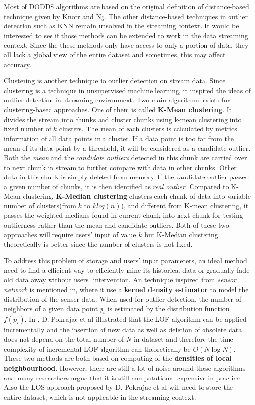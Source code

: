\documentclass[11pt]{article}       %
\begin{document}
Most of DODDS algorithms are based on the original definition of distance-based technique given by Knorr and Ng\cite{EKnorr:1998}. The other distance-based techniques in outlier detection such as KNN remain unsolved in the streaming context. It would be interested to see if those methods can be extended to work in the data streaming context. Since the these methods only have access to only a portion of data, they all lack a global view of the entire dataset and sometimes, this may affect accuracy. 

Clustering is another technique to outlier detection on stream data. Since clustering is a technique in unsupervised machine learning, it inspired the ideas of outlier detection in streaming environment. Two main algorithms exists for clustering-based approaches. One of them is called \textbf{K-Mean clustering}\cite{04666541}. It divides the stream into chunks and cluster chunks using k-mean clustering into fixed number of $k$ clusters. The mean of each clusters is calculated by metrics information of all data points in a cluster. If a data point is too far from the mean of its data point by a threshold, it will be considered as a candidate outlier. Both the \textit{mean} and the \textit{candidate outliers} detected in this chunk are carried over to next chunk in stream to further compare with data in other chunks. Other data in this chunk is simply deleted from memory. If the candidate outlier passed a given number of chunks, it is then identified as \textit{real outlier}. Compared to K-Mean clustering, \textbf{K-Median clustering}\cite{DBLP:journals/corr/abs-1002-4003} clusters each chunk of data into variable number of clusters(from $k$ to $k log(n)$), and different from K-mean clustering, it passes the weighted medians found in current chunk into next chunk for testing outlierness rather than the mean and candidate outliers. Both of these two approaches will require users' input of value $k$ but K-Median clustering theoretically is better since the number of clusters is not fixed. 

To address this problem of storage and users' input parameters, an ideal method need to find a efficient way to efficiently mine its historical data or gradually fade old data away without users' intervention. An technique inspired from \textit{sensor network} is mentioned in\cite{Subramaniam:2006:OOD:1182635.1164145}, where it use a \textbf{kernel density estimator} to model the distribution of the sensor data. When used for outlier detection, the number of neighbors of a given data point $p_{i}$ is estimated by the distribution function $f(p_{i})$. In \cite{4221341}, D. Pokrajac et al illustrated that the LOF algorithm can be applied incrementally and the insertion of new data as well as deletion of obsolete data does not depend on the total number of $N$ in dataset and therefore the time complexity of incremental LOF algorithm can theoretically be $O(N\log{N})$. These two methods are both based on computing of the \textbf{densities of local neighbourhood}. However, there are still a lot of noise around these algorithms and many researchers argue that it is still computational expensive in practice. Also the LOS approach proposed by D. Pokrajac et al will need to store the entire dataset, which is not applicable in the streaming context.
\end{document}
